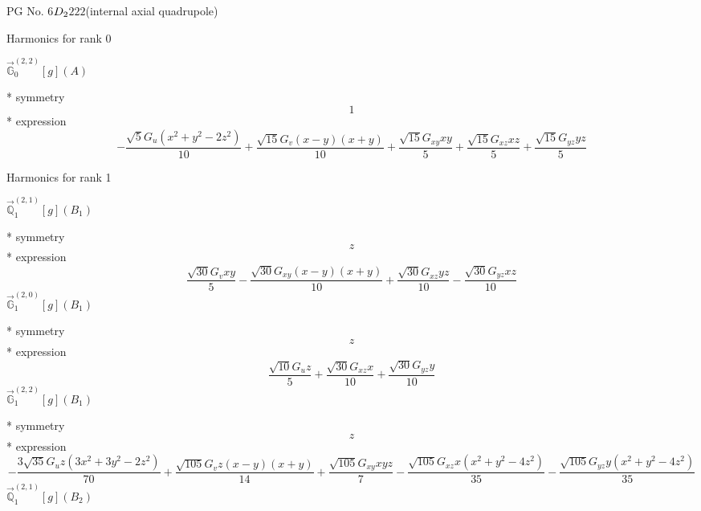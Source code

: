 \documentclass[fleqn,8pt]{jsarticle}
\begin{document}
\setcounter{MaxMatrixCols}{32}

\renewcommand{\tablename}{Table~}
\renewcommand{\figurename}{Figure~}
\begin{center}
\LARGE
PG No. 6\quad$D_{\rm 2}$\quad$222$\quad[ orthorhombic ] (internal axial quadrupole)
\end{center}

\noindent * Harmonics for rank 0

\noindent\quad $\vec{\mathbb{G}}_{0}^{(2,2)}[g](A)$

\noindent\quad ** symmetry
\begin{dmath*}
1
\end{dmath*}
\noindent\quad ** expression
\begin{dmath*}
- \frac{\sqrt{5} G_{u} \left(x^{2} + y^{2} - 2 z^{2}\right)}{10} + \frac{\sqrt{15} G_{v} \left(x - y\right) \left(x + y\right)}{10} + \frac{\sqrt{15} G_{xy} x y}{5} + \frac{\sqrt{15} G_{xz} x z}{5} + \frac{\sqrt{15} G_{yz} y z}{5}
\end{dmath*}

\noindent * Harmonics for rank 1

\noindent\quad $\vec{\mathbb{Q}}_{1}^{(2,1)}[g](B_{1})$

\noindent\quad ** symmetry
\begin{dmath*}
z
\end{dmath*}
\noindent\quad ** expression
\begin{dmath*}
\frac{\sqrt{30} G_{v} x y}{5} - \frac{\sqrt{30} G_{xy} \left(x - y\right) \left(x + y\right)}{10} + \frac{\sqrt{30} G_{xz} y z}{10} - \frac{\sqrt{30} G_{yz} x z}{10}
\end{dmath*}
\noindent\quad $\vec{\mathbb{G}}_{1}^{(2,0)}[g](B_{1})$

\noindent\quad ** symmetry
\begin{dmath*}
z
\end{dmath*}
\noindent\quad ** expression
\begin{dmath*}
\frac{\sqrt{10} G_{u} z}{5} + \frac{\sqrt{30} G_{xz} x}{10} + \frac{\sqrt{30} G_{yz} y}{10}
\end{dmath*}
\noindent\quad $\vec{\mathbb{G}}_{1}^{(2,2)}[g](B_{1})$

\noindent\quad ** symmetry
\begin{dmath*}
z
\end{dmath*}
\noindent\quad ** expression
\begin{dmath*}
- \frac{3 \sqrt{35} G_{u} z \left(3 x^{2} + 3 y^{2} - 2 z^{2}\right)}{70} + \frac{\sqrt{105} G_{v} z \left(x - y\right) \left(x + y\right)}{14} + \frac{\sqrt{105} G_{xy} x y z}{7} - \frac{\sqrt{105} G_{xz} x \left(x^{2} + y^{2} - 4 z^{2}\right)}{35} - \frac{\sqrt{105} G_{yz} y \left(x^{2} + y^{2} - 4 z^{2}\right)}{35}
\end{dmath*}
\noindent\quad $\vec{\mathbb{Q}}_{1}^{(2,1)}[g](B_{2})$
\end{document}
